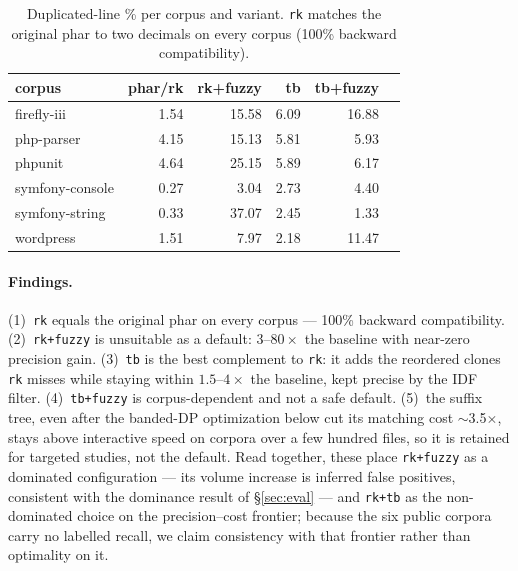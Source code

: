\documentclass[10pt,a4paper]{article}
\newcounter{lem}[section]
\begin{document}
\begin{table}[h]
\centering
\caption{Duplicated-line \% per corpus and variant. \texttt{rk} matches the original phar to two
decimals on every corpus (100\% backward compatibility).}
\label{tab:compare}
\small
\begin{tabular}{l rrrrr}
\toprule
\textbf{corpus} & \textbf{phar/rk} & \textbf{rk+fuzzy} & \textbf{tb} & \textbf{tb+fuzzy} \\
\midrule
firefly-iii      & 1.54  & 15.58 & 6.09 & 16.88 \\
php-parser       & 4.15  & 15.13 & 5.81 & 5.93 \\
phpunit          & 4.64  & 25.15 & 5.89 & 6.17 \\
symfony-console  & 0.27  & 3.04  & 2.73 & 4.40 \\
symfony-string   & 0.33  & 37.07 & 2.45 & 1.33 \\
wordpress        & 1.51  & 7.97  & 2.18 & 11.47 \\
\bottomrule
\end{tabular}
\end{table}

\paragraph{Findings.} (1)~\texttt{rk} equals the original phar on every corpus --- 100\% backward
compatibility. (2)~\texttt{rk+fuzzy} is unsuitable as a default: $3$--$80\times$ the baseline with
near-zero precision gain. (3)~\texttt{tb} is the best complement to \texttt{rk}: it adds the
reordered clones \texttt{rk} misses while staying within $1.5$--$4\times$ the baseline, kept precise
by the IDF filter. (4)~\texttt{tb+fuzzy} is corpus-dependent and not a safe default.
(5)~the suffix tree, even after the banded-DP optimization below cut its matching cost
$\sim$3.5$\times$, stays above interactive speed on corpora over a few hundred files, so it is retained
for targeted studies, not the default. Read together, these place \texttt{rk+fuzzy} as a dominated
configuration --- its volume increase is inferred false positives, consistent with the dominance
result of \S\ref{sec:eval} --- and \texttt{rk+tb} as the non-dominated choice on the precision--cost
frontier; because the six public corpora carry no labelled recall, we claim consistency with that
frontier rather than optimality on it.
\end{document}
